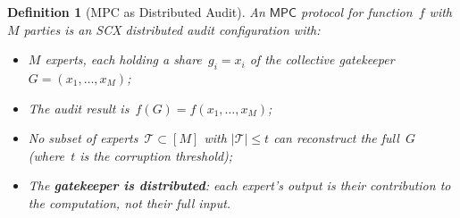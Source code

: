 \documentclass[12pt,a4paper]{article}
\newtheorem{definition}[theorem]{Definition}
\theoremstyle{remark}
\newcommand{\T}{\mathcal{T}}
\newcommand{\SCX}{\textsf{SCX}}
\newcommand{\MPC}{\textsf{MPC}}
\begin{document}
\begin{definition}[MPC as Distributed Audit]
\label{def:mpc_audit}
An $\MPC$ protocol for function~$f$ with $M$ parties is an \SCX{} distributed audit configuration with:
\begin{itemize}[leftmargin=*]
  \item $M$ experts, each holding a share~$g_i = x_i$ of the collective gatekeeper~$G = (x_1, \ldots, x_M)$;
  \item The audit result is~$f(G) = f(x_1, \ldots, x_M)$;
  \item No subset of experts~$\T \subset [M]$ with $|\T| \leq t$ can reconstruct the full~$G$ (where~$t$ is the corruption threshold);
  \item The \textbf{gatekeeper is distributed}: each expert's output is their contribution to the computation, not their full input.
\end{itemize}
\end{definition}
\end{document}
